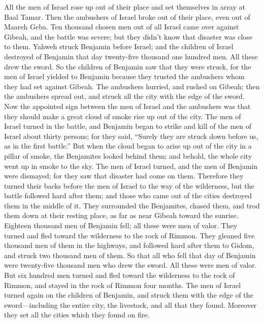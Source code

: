  All the men of Israel rose up out of their place and set
themselves in array at Baal Tamar. Then the ambushers of Israel broke
out of their place, even out of Maareh Geba.  Ten thousand
chosen men out of all Israel came over against Gibeah, and the battle
was severe; but they didn't know that disaster was close to them.
 Yahweh struck Benjamin before Israel; and the children of
Israel destroyed of Benjamin that day twenty-five thousand one hundred
men. All these drew the sword.  So the children of Benjamin
saw that they were struck, for the men of Israel yielded to Benjamin
because they trusted the ambushers whom they had set against Gibeah.
 The ambushers hurried, and rushed on Gibeah; then the
ambushers spread out, and struck all the city with the edge of the
sword.  Now the appointed sign between the men of Israel
and the ambushers was that they should make a great cloud of smoke rise
up out of the city.  The men of Israel turned in the
battle, and Benjamin began to strike and kill of the men of Israel about
thirty persons; for they said, ``Surely they are struck down before us,
as in the first battle.''  But when the cloud began to
arise up out of the city in a pillar of smoke, the Benjamites looked
behind them; and behold, the whole city went up in smoke to the sky.
 The men of Israel turned, and the men of Benjamin were
dismayed; for they saw that disaster had come on them. 
Therefore they turned their backs before the men of Israel to the way of
the wilderness, but the battle followed hard after them; and those who
came out of the cities destroyed them in the middle of it. 
They surrounded the Benjamites, chased them, and trod them down at their
resting place, as far as near Gibeah toward the sunrise. 
Eighteen thousand men of Benjamin fell; all these were men of valor.
 They turned and fled toward the wilderness to the rock of
Rimmon. They gleaned five thousand men of them in the highways, and
followed hard after them to Gidom, and struck two thousand men of them.
 So that all who fell that day of Benjamin were twenty-five
thousand men who drew the sword. All these were men of valor.
 But six hundred men turned and fled toward the wilderness
to the rock of Rimmon, and stayed in the rock of Rimmon four months.
 The men of Israel turned again on the children of
Benjamin, and struck them with the edge of the sword---including the
entire city, the livestock, and all that they found. Moreover they set
all the cities which they found on fire.

